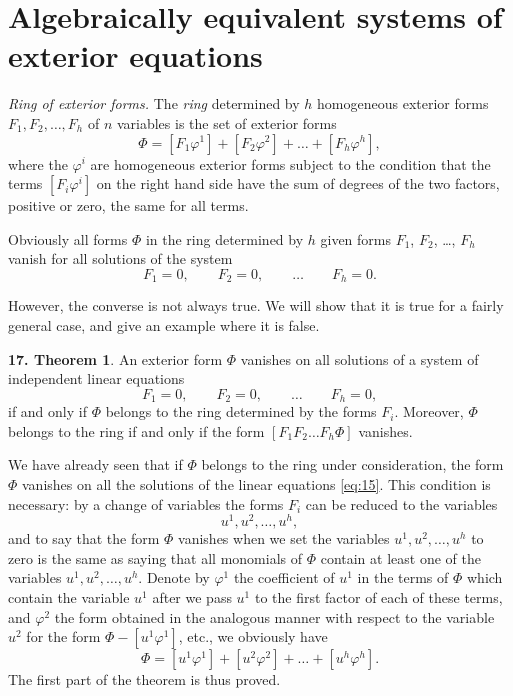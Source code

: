 \documentclass[leqno,11pt]{book}
\numberwithin{equation}{chapter}
\theoremstyle{shape1}
\theoremstyle{shape0}
\theoremstyle{shape2}
\theoremstyle{definition}
\begin{document}
\section{Algebraically equivalent systems of exterior equations}
\label{sec:algebr-equiv-syst}

\fsec \emph{Ring of exterior forms.} The \emph{ring} determined by $h$ homogeneous exterior forms $F_{1},F_{2},\dots,F_{h}$ of $n$ variables is the set of exterior forms
\[
\Phi=[F_{1}\varphi^{1}]+[F_{2}\varphi^{2}]+\dots+[F_{h}\varphi^{h}],
\]
where the $\varphi^{i}$ are homogeneous exterior forms subject to the  condition that  the terms $[F_{i}\varphi^{i}]$ on the right hand side have the sum of degrees of the two factors, positive or zero, the same for all  terms.

Obviously all forms $\Phi$ in the ring determined by $h$ given forms $F_{1}$, $F_{2}$, \dots , $F_{h}$ vanish for all solutions of the system
\[
F_{1}=0,\qquad F_{2}=0,\qquad\dots\qquad F_{h}=0.
\]

However, the converse is not always true. We will show that it is true for a fairly general case, and give an example where it is false.

\vspace{12pt}\addtocounter{frenchsec}{1}
\theoremstyle{shape1}
\newtheorem*{thm17}{\hspace{15pt}\textbf{17.} Theorem}
\begin{thm17}
  An exterior form $\Phi$  vanishes on all solutions of a system of independent linear equations
  \begin{equation}
    \label{eq:15}
    F_{1}=0,\qquad F_{2}=0,\qquad\dots\qquad F_{h}=0,
  \end{equation}
if and only if $\Phi$ belongs to the ring determined by the forms $F_{i}$. Moreover,  $\Phi$  belongs to the ring if and only if the form $[F_{1}F_{2}\dots F_{h}\Phi]$ vanishes.
\end{thm17}

We have already seen that if $\Phi$ belongs to the ring under consideration, the form $\Phi$ vanishes on all the solutions of the linear equations \eqref{eq:15}. This condition is necessary: by a change of variables the forms $F_{i}$ can be reduced to the variables
\[
u^{1},u^{2},\dots,u^{h},
\]
and to say that the form $\Phi$ vanishes when we set the variables $u^{1},u^{2},\dots,u^{h}$ to zero is the same as saying that all monomials of $\Phi$ contain at least one of the variables $u^{1},u^{2},\dots,u^{h}$. Denote by $\varphi^{1}$ the coefficient of $u^{1}$ in the terms of $\Phi$ which contain the variable $u^{1}$ after we pass $u^{1}$ to the first factor of each of these terms, and $\varphi^{2}$ the form obtained in the analogous manner with respect to the variable $u^{2}$ for the form $\Phi-[u^{1}\varphi^{1}]$, {etc.},  we obviously have
\begin{equation}
  \label{eq:16}  
  \Phi=[u^{1}\varphi^{1}]+[u^{2}\varphi^{2}]+\dots+[u^{h}\varphi^{h}].
\end{equation}
The first part of the theorem is thus proved.
\end{document}

